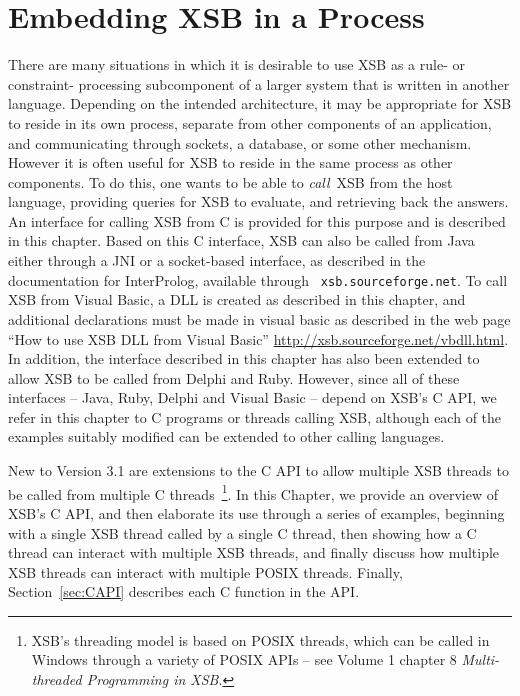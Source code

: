 \chapter{Embedding XSB in a Process}
\label{ccallingxsb}

There are many situations in which it is desirable to use XSB as a
rule- or constraint- processing subcomponent of a larger system that
is written in another language.  Depending on the intended
architecture, it may be appropriate for XSB to reside in its own
process, separate from other components of an application, and
communicating through sockets, a database, or some other mechanism.
However it is often useful for XSB to reside in the same process as
other components.  To do this, one wants to be able to {\em call}\ XSB
from the host language, providing queries for XSB to evaluate, and
retrieving back the answers.  An interface for calling XSB from C is
provided for this purpose and is described in this chapter.  Based on
this C interface, XSB can also be called from Java either through a
JNI or a socket-based interface, as described in the
documentation for InterProlog, available through {\tt
  xsb.sourceforge.net}.  To call XSB from Visual Basic, a DLL is
created as described in this chapter, and additional declarations must
be made in visual basic as described in the web page ``How to use XSB
DLL from Visual Basic'' \url{http://xsb.sourceforge.net/vbdll.html}.
In addition, the interface described in this chapter has also been
extended to allow XSB to be called from Delphi and Ruby.  However,
since all of these interfaces -- Java, Ruby, Delphi and Visual Basic --
depend on XSB's C API, we refer in this chapter to C programs or
threads calling XSB, although each of the examples suitably modified
can be extended to other calling languages.

New to Version 3.1 are extensions to the C API to allow multiple XSB
threads to be called from multiple C threads~\footnote{XSB's threading
  model is based on POSIX threads, which can be called in Windows
  through a variety of POSIX APIs -- see Volume 1 chapter 8 {\em
    Multi-threaded Programming in XSB}.}.  In this Chapter, we provide
an overview of XSB's C API, and then elaborate its use through a
series of examples, beginning with a single XSB thread called by a
single C thread, then showing how a C thread can interact with
multiple XSB threads, and finally discuss how multiple XSB threads can
interact with multiple POSIX threads.  Finally, Section~\ref{sec:CAPI}
describes each C function in the API.


